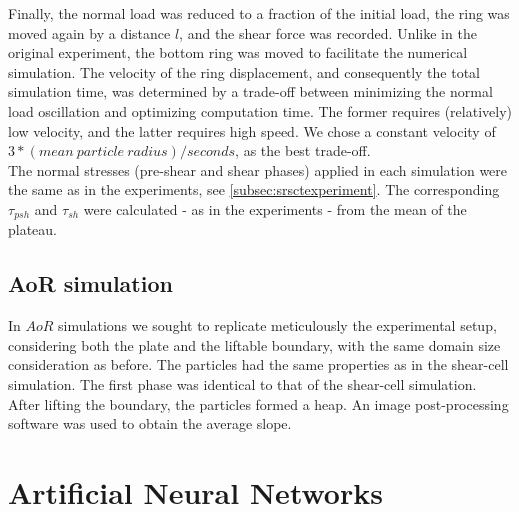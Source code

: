 \documentclass[review]{elsarticle}
\begin{document}
\begin{appendix}
Finally, the normal load was reduced to a fraction of the initial load, 
the ring was moved again by a distance $l$, and the shear force was recorded. 
Unlike in the original experiment, the bottom ring was moved to facilitate the numerical simulation. 
The velocity of the ring displacement, and consequently the total simulation time, 
was determined by a trade-off between minimizing the normal load oscillation and
optimizing computation time. 
The former requires (relatively) low velocity, and the latter requires high
speed.
We chose a constant velocity of $3*(mean ~ particle ~ radius)/seconds$, as the
best trade-off.\\
The normal stresses (pre-shear and shear phases) applied in each simulation were
the same as in the experiments, see \ref{subsec:srsctexperiment}.
The corresponding $\tau_{psh}$ and $\tau_{sh}$ were calculated - as in the experiments - from the mean of the plateau.\\

\subsection{AoR simulation}
\label{subsec:aorsimulation}
In $AoR$ simulations we sought to replicate meticulously the experimental setup, 
considering both the plate and the liftable boundary, with the same domain size consideration as before. 
The particles had the same properties as in the shear-cell simulation. 
The first phase was identical to that of the shear-cell simulation. 
After lifting the boundary, the particles formed a heap.
An image post-processing software was used to obtain the average slope.


\section{Artificial Neural Networks}
\label{sec:appann}


\end{appendix}
\end{document}
